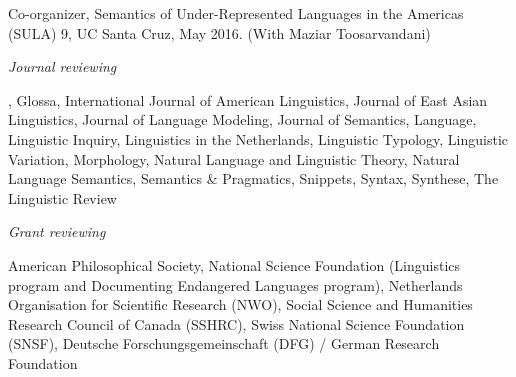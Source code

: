 \documentclass[12pt]{article}
\begin{document}
 
 \ind Co-organizer, Semantics of Under-Represented Languages in the Americas (SULA) 9, UC Santa Cruz, May 2016.  (With Maziar Toosarvandani)


\bigskip%


\noindent\emph{Journal reviewing\vspace{0.05in}}

, 
		{Glossa,} 
{International Journal of American Linguistics}, 
		{Journal of East Asian Linguistics, 
		Journal of Language Modeling,
		{Journal of Semantics},} 
{Language}, 
		{Linguistic Inquiry,} 
{Linguistics in the Netherlands}, 
	{Linguistic Typology,} 
{Linguistic Variation}, 
Morphology, 
		{{Natural Language and Linguistic Theory}, 
	{Natural Language Semantics}, 
		Semantics \& Pragmatics, 
		{Snippets}, 
		{Syntax},  
		Synthese,}
{The Linguistic Review}

















 
 
 



\bigskip%



\noindent\emph{Grant reviewing\vspace{0.05in}}


\noindent 
 American Philosophical Society, National Science Foundation (Linguistics program and Documenting Endangered Languages program),  Netherlands Organisation for Scientific Research (NWO),  Social Science and Humanities Research Council of Canada (SSHRC),  Swiss National Science Foundation (SNSF), Deutsche Forschungsgemeinschaft (DFG) / German Research Foundation
\end{document}
